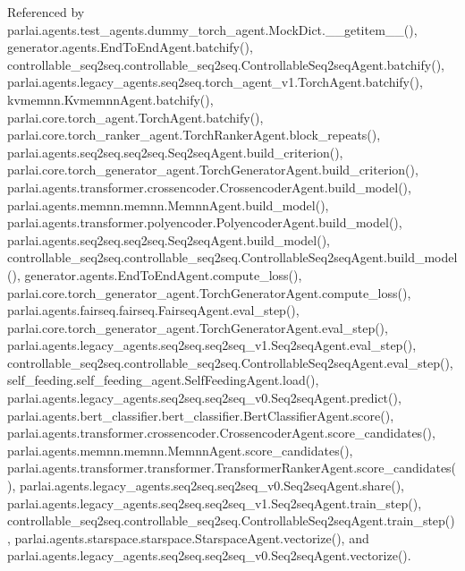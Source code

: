 Referenced by parlai.\+agents.\+test\+\_\+agents.\+dummy\+\_\+torch\+\_\+agent.\+Mock\+Dict.\+\_\+\+\_\+getitem\+\_\+\+\_\+(), generator.\+agents.\+End\+To\+End\+Agent.\+batchify(), controllable\+\_\+seq2seq.\+controllable\+\_\+seq2seq.\+Controllable\+Seq2seq\+Agent.\+batchify(), parlai.\+agents.\+legacy\+\_\+agents.\+seq2seq.\+torch\+\_\+agent\+\_\+v1.\+Torch\+Agent.\+batchify(), kvmemnn.\+Kvmemnn\+Agent.\+batchify(), parlai.\+core.\+torch\+\_\+agent.\+Torch\+Agent.\+batchify(), parlai.\+core.\+torch\+\_\+ranker\+\_\+agent.\+Torch\+Ranker\+Agent.\+block\+\_\+repeats(), parlai.\+agents.\+seq2seq.\+seq2seq.\+Seq2seq\+Agent.\+build\+\_\+criterion(), parlai.\+core.\+torch\+\_\+generator\+\_\+agent.\+Torch\+Generator\+Agent.\+build\+\_\+criterion(), parlai.\+agents.\+transformer.\+crossencoder.\+Crossencoder\+Agent.\+build\+\_\+model(), parlai.\+agents.\+memnn.\+memnn.\+Memnn\+Agent.\+build\+\_\+model(), parlai.\+agents.\+transformer.\+polyencoder.\+Polyencoder\+Agent.\+build\+\_\+model(), parlai.\+agents.\+seq2seq.\+seq2seq.\+Seq2seq\+Agent.\+build\+\_\+model(), controllable\+\_\+seq2seq.\+controllable\+\_\+seq2seq.\+Controllable\+Seq2seq\+Agent.\+build\+\_\+model(), generator.\+agents.\+End\+To\+End\+Agent.\+compute\+\_\+loss(), parlai.\+core.\+torch\+\_\+generator\+\_\+agent.\+Torch\+Generator\+Agent.\+compute\+\_\+loss(), parlai.\+agents.\+fairseq.\+fairseq.\+Fairseq\+Agent.\+eval\+\_\+step(), parlai.\+core.\+torch\+\_\+generator\+\_\+agent.\+Torch\+Generator\+Agent.\+eval\+\_\+step(), parlai.\+agents.\+legacy\+\_\+agents.\+seq2seq.\+seq2seq\+\_\+v1.\+Seq2seq\+Agent.\+eval\+\_\+step(), controllable\+\_\+seq2seq.\+controllable\+\_\+seq2seq.\+Controllable\+Seq2seq\+Agent.\+eval\+\_\+step(), self\+\_\+feeding.\+self\+\_\+feeding\+\_\+agent.\+Self\+Feeding\+Agent.\+load(), parlai.\+agents.\+legacy\+\_\+agents.\+seq2seq.\+seq2seq\+\_\+v0.\+Seq2seq\+Agent.\+predict(), parlai.\+agents.\+bert\+\_\+classifier.\+bert\+\_\+classifier.\+Bert\+Classifier\+Agent.\+score(), parlai.\+agents.\+transformer.\+crossencoder.\+Crossencoder\+Agent.\+score\+\_\+candidates(), parlai.\+agents.\+memnn.\+memnn.\+Memnn\+Agent.\+score\+\_\+candidates(), parlai.\+agents.\+transformer.\+transformer.\+Transformer\+Ranker\+Agent.\+score\+\_\+candidates(), parlai.\+agents.\+legacy\+\_\+agents.\+seq2seq.\+seq2seq\+\_\+v0.\+Seq2seq\+Agent.\+share(), parlai.\+agents.\+legacy\+\_\+agents.\+seq2seq.\+seq2seq\+\_\+v1.\+Seq2seq\+Agent.\+train\+\_\+step(), controllable\+\_\+seq2seq.\+controllable\+\_\+seq2seq.\+Controllable\+Seq2seq\+Agent.\+train\+\_\+step(), parlai.\+agents.\+starspace.\+starspace.\+Starspace\+Agent.\+vectorize(), and parlai.\+agents.\+legacy\+\_\+agents.\+seq2seq.\+seq2seq\+\_\+v0.\+Seq2seq\+Agent.\+vectorize().

